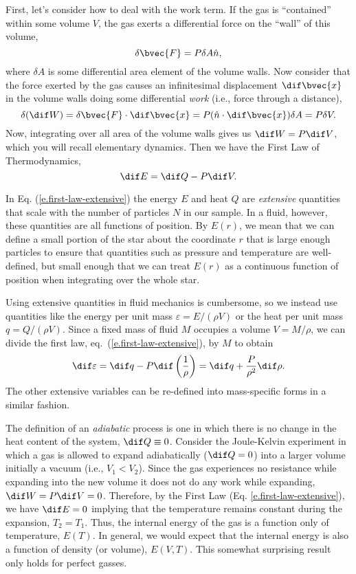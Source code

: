 First, let's consider how to deal with the work term.
If the gas is ``contained'' within some volume $V$, the gas exerts a differential force on the ``wall'' of this volume,
\[
	\delta \bvec{F} = P \delta A \hat{n},
\]
where $\delta A$ is some differential area element of the volume walls.
Now consider that the force exerted by the gas causes an infinitesimal displacement $\dif \bvec{x}$ in the volume walls doing some differential {\it work} (i.e., force through a distance),
\[
	\delta (\dif W) = \delta \bvec{F}\cdot\dif\bvec{x} = P (\hat{n}\cdot\dif\bvec{x})\delta A = P \delta V.
\]
Now, integrating over all area of the volume walls gives us $\dif W = P\dif V$, which you will recall elementary dynamics.
Then we have the First Law of Thermodynamics,
\begin{equation}
	\dif E = \dif Q - P\dif V. \label{e.first-law-extensive}
\end{equation}

In Eq. (\ref{e.first-law-extensive}) the energy $E$ and heat $Q$ are {\it extensive} quantities that scale with the number of particles $N$ in our sample. In a fluid, however, these quantities are all functions of position. By $E(r)$, we mean that we can define a small portion of the star about the coordinate $r$ that is large enough particles to ensure that quantities such as pressure and temperature are well-defined, but small enough that we can treat $E(r)$ as a continuous function of position when integrating over the whole star.

Using extensive quantities in fluid mechanics is cumbersome, so we instead use quantities like the energy per unit mass $\varepsilon  = E/(\rho V)$ or the heat per unit mass $q = Q/(\rho V)$. Since a fixed mass of fluid $M$ occupies a volume $V = M/\rho$, we can divide the first law, eq.~(\ref{e.first-law-extensive}), by $M$ to obtain
\begin{equation}\label{e.first-law-intensive}
\dif \varepsilon = \dif q - P\dif\left(\frac{1}{\rho}\right) = \dif q + \frac{P}{\rho^{2}}\dif \rho.
\end{equation}
The other extensive variables can be re-defined into mass-specific forms in a similar fashion.

The definition of an {\it adiabatic} process is one in which there is no change in the heat content of the system, $\dif Q \equiv 0$.
Consider the Joule-Kelvin experiment in which a gas is allowed to expand adiabatically ($\dif Q=0$) into a larger volume initially a vacuum (i.e., $V_1 < V_2$).
Since the gas experiences no resistance while expanding into the new volume it does not do any work while expanding, $\dif W = P\dif V = 0$.
Therefore, by the First Law (Eq. \ref{e.first-law-extensive}), we have $\dif E = 0$ implying that the temperature remains constant during the expansion, $T_2 = T_1$.
Thus, the internal energy of the gas is a function only of temperature, $E(T)$.
In general, we would expect that the internal energy is also a function of density (or volume), $E(V,T)$.
This somewhat surprising result only holds for perfect gasses.

